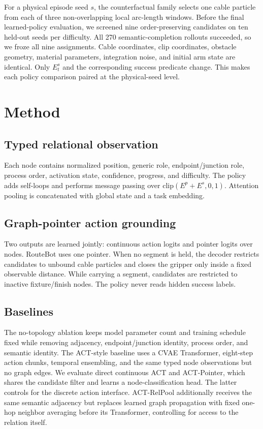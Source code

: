 \documentclass[journal]{IEEEtran}
\begin{document}
For a physical episode seed $s$, the counterfactual family selects one cable
particle from each of three non-overlapping local arc-length windows.  Before
the final learned-policy evaluation, we screened nine order-preserving candidates
on ten held-out seeds per difficulty. All 270 semantic-completion rollouts
succeeded, so we froze all nine assignments. Cable coordinates, clip coordinates, obstacle geometry,
material parameters, integration noise, and initial arm state are identical.
Only $E_t^{s}$ and the corresponding success predicate change.  This makes each
policy comparison paired at the physical-seed level.

\section{Method}

\subsection{Typed relational observation}

Each node contains normalized position, generic role, endpoint/junction role,
process order, activation state, confidence, progress, and difficulty.  The
policy adds self-loops and performs message passing over
$\mathrm{clip}(E^p+E^s,0,1)$.  Attention pooling is concatenated with global
state and a task embedding.

\subsection{Graph-pointer action grounding}

Two outputs are learned jointly: continuous action logits and pointer logits
over nodes.  RouteBot uses one pointer.  When no segment is held, the decoder
restricts candidates to unbound cable particles and closes the gripper only
inside a fixed observable distance.  While carrying a segment, candidates are
restricted to inactive fixture/finish nodes.  The policy never reads hidden
success labels.

\subsection{Baselines}

The no-topology ablation keeps model parameter count and training schedule
fixed while removing adjacency, endpoint/junction identity, process order, and
semantic identity.  The ACT-style baseline uses a CVAE Transformer, eight-step
action chunks, temporal ensembling, and the same typed node observations but no
graph edges.  We evaluate direct continuous ACT and ACT-Pointer, which shares
the candidate filter and learns a node-classification head.  The latter
controls for the discrete action interface. ACT-RelPool additionally receives
the same semantic adjacency but replaces learned graph propagation with fixed
one-hop neighbor averaging before its Transformer, controlling for access to
the relation itself.
\end{document}
